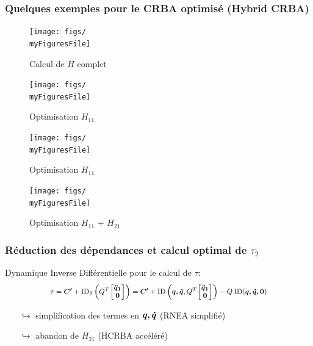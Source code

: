 \documentclass[10pt]{beamer}
\begin{document}
\begin{frame}
  \frametitle{Quelques exemples pour le CRBA optimisé (Hybrid CRBA)}
  
	\begin{figure}[H]
	  \begin{center}
	  \texttt{[image: figs/\\myFiguresFile]}
	  \caption{Calcul de $H$ complet}
	  \texttt{[image: figs/\\myFiguresFile]}
	  \caption{Optimisation $H_{11}$}
	  \end{center}
	\end{figure}
	
\end{frame}

\begin{frame}
	\begin{figure}[H]
	  \begin{center}
	  \texttt{[image: figs/\\myFiguresFile]}
	  \caption{Optimisation $H_{11}$}
	  \texttt{[image: figs/\\myFiguresFile]}
	  \caption{Optimisation $H_{11}$ + $H_{21}$}
	  \end{center}
	\end{figure}
	
\end{frame}

\begin{frame}
  \frametitle{Réduction des dépendances et calcul optimal de $\tau_2$}

  Dynamique Inverse Différentielle pour le calcul de $\tau$:
	\begin{equation}\footnotesize
	\tau = \boldsymbol{C'} + \mathrm{ID}_{\delta} \left( Q^T \boldsymbol{\begin{bmatrix} 
	                                                         \ddot{q}_1 \\
	                                                         0 
	                                                       \end{bmatrix}} \right) \label{equ_tauIDdiff_2}
	=
	\boldsymbol{C'} + \mathrm{ID} \left( \boldsymbol{q,\dot{q}},Q^T \boldsymbol{\begin{bmatrix}
	                                                         \ddot{q}_1 \\      
	                                                          0         
	                                                       \end{bmatrix}} \right) - Q \: \mathrm{ID}(\boldsymbol{q,\dot{q},0})
	\end{equation}
	
	\bigskip
	
	\begin{itemize}
	\item[$\hookrightarrow$] simplification des termes en $\boldsymbol{q, \dot{q}}$ (RNEA simplifié)
	\item[$\hookrightarrow$] abandon de $H_{21}$ (HCRBA accéléré)
	\end{itemize}
  
\end{frame}
\end{document}
